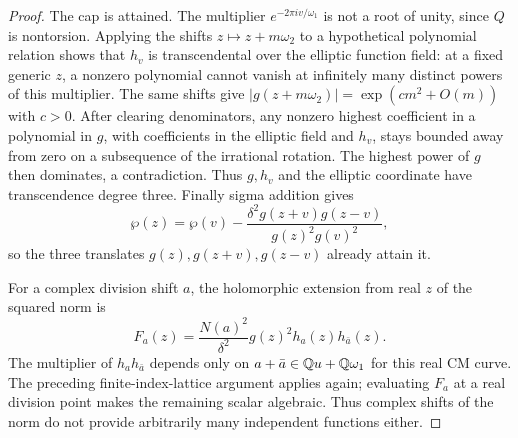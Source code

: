 \begin{proof}
The cap is attained.  The multiplier
$e^{-2\pi iv/\omega_1}$ is not a root of unity, since $Q$
is nontorsion.  Applying the shifts $z\mapsto z+m\omega_2$
to a hypothetical polynomial relation shows that $h_v$ is
transcendental over the elliptic function field: at a fixed
generic $z$, a nonzero polynomial cannot vanish at infinitely
many distinct powers of this multiplier.  The same shifts
give $|g(z+m\omega_2)|=\exp(c m^2+O(m))$ with $c>0$.
After clearing denominators, any nonzero highest coefficient in
a polynomial in $g$, with coefficients in the elliptic field and
$h_v$, stays bounded
away from zero on a subsequence of the irrational rotation.
The highest power of $g$ then dominates, a contradiction.
Thus $g,h_v$ and the elliptic coordinate have transcendence
degree three.  Finally sigma addition gives
\[
 \wp(z)=\wp(v)-
 \frac{\delta^2g(z+v)g(z-v)}{g(z)^2g(v)^2},
\]
so the three translates $g(z),g(z+v),g(z-v)$ already attain it.

For a complex division shift $a$, the holomorphic extension
from real $z$ of the squared norm is
\[
 F_a(z)=\frac{N(a)^2}{\delta^2}
                  g(z)^2h_a(z)h_{\bar a}(z).
\]
The multiplier of $h_ah_{\bar a}$ depends only on
$a+\bar a\in\mathbb Q u+\mathbb Q\omega_1$ for this real CM curve.
The preceding finite-index-lattice argument applies again;
evaluating $F_a$ at a real division point makes the remaining
scalar algebraic.  Thus complex shifts of the norm do not
provide arbitrarily many independent functions either.


\end{proof}
